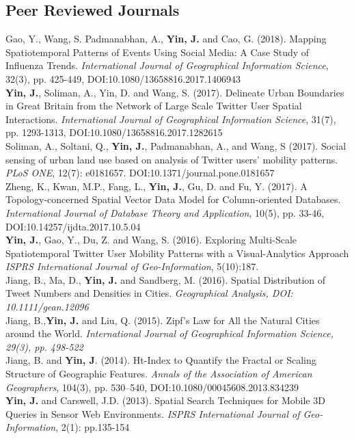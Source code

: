 \documentclass[11pt, a4paper]{article}
\newcommand{\years}[1]{\marginnote{\scriptsize #1}}
\begin{document}
\subsection*{Peer Reviewed Journals}
\noindent
\years{2018}Gao, Y., Wang, S. Padmanabhan, A., \textbf{Yin, J.} and Cao, G. (2018). Mapping Spatiotemporal Patterns of Events Using Social Media: A Case Study of Influenza Trends. \textit{International Journal of Geographical Information Science}, 32(3), pp. 425-449, DOI:10.1080/13658816.2017.1406943\\
\years{2017}\textbf{Yin, J.}, Soliman, A., Yin, D. and Wang, S. (2017). Delineate Urban Boundaries in Great Britain from the Network of Large Scale Twitter User Spatial Interactions. \textit{International Journal of Geographical Information Science}, 31(7), pp. 1293-1313, DOI:10.1080/13658816.2017.1282615\\
\years{2017} Soliman, A., Soltani, Q., \textbf{Yin, J.}, Padmanabhan, A., and Wang, S (2017). Social sensing of urban land use based on analysis of Twitter users' mobility patterns. \textit{PLoS ONE}, 12(7): e0181657. DOI:10.1371/journal.pone.0181657\\
\years{2017}Zheng, K., Kwan, M.P., Fang, L., \textbf{Yin, J.}, Gu, D. and Fu, Y. (2017). A Topology-concerned Spatial Vector Data Model for Column-oriented Databases. \textit{International Journal of Database Theory and Application}, 10(5), pp. 33-46, DOI:10.14257/ijdta.2017.10.5.04\\
\years{2016}\textbf{Yin, J.}, Gao, Y., Du, Z. and Wang, S. (2016). Exploring Multi-Scale Spatiotemporal Twitter User Mobility Patterns with a Visual-Analytics Approach \textit{ISPRS International Journal of Geo-Information}, 5(10):187.\\
\years{2016}Jiang, B., Ma, D., \textbf{Yin, J.} and Sandberg, M. (2016). Spatial Distribution of Tweet Numbers and Densities in Cities. \textit{ Geographical Analysis, DOI: 10.1111/gean.12096}\\
\years{2015}Jiang, B.,\textbf{Yin, J.} and Liu, Q. (2015). Zipf's Law for All the Natural Cities around the World. \textit{International Journal of Geographical Information Science, 29(3), pp. 498-522}\\
\years{2014}Jiang, B. and \textbf{Yin, J}. (2014). Ht-Index to Quantify the Fractal or Scaling Structure of Geographic Features. \textit{Annals of the Association of American Geographers}, 104(3), pp. 530–540, DOI:10.1080/00045608.2013.834239\\
\years{2013}\textbf{Yin, J.} and Carswell, J.D. (2013). Spatial Search Techniques for Mobile 3D Queries in Sensor Web Environments. \textit{ISPRS International Journal of Geo-Information}, 2(1): pp.135-154\\
\end{document}
